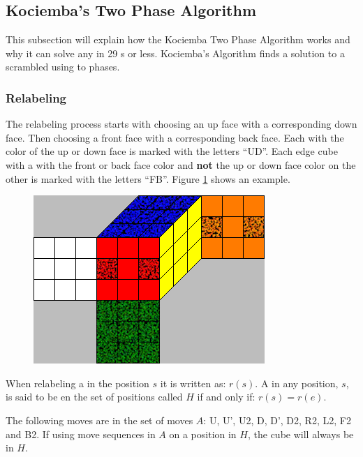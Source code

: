 \subsection{Kociemba's Two Phase Algorithm}
This subsection will explain how the Kociemba Two Phase Algorithm works and why it can solve any \rubik{} in 29 \twist{}s or less. Kociemba's Algorithm finds a solution to a scrambled \rubik{} using to phases.

\subsubsection{Relabeling}
The relabeling process  starts with choosing an up face with a corresponding down face. Then choosing a front face with a corresponding back face. Each \facelet{} with the color of the up or down face is marked with the letters ``UD''. Each edge cube with a \facelet{} with the front or back face color and \textbf{not} the up or down face color on the other \facelet{} is marked with the letters ``FB''. Figure \ref{fig:relabel1} shows an example.

\begin{figure}[hb]
	\centering
		\includegraphics{input/pics/relabel1}
	\caption{}
	\label{fig:relabel1}
\end{figure}

When relabeling a \rubik{} in the position $s$ it is written as: $r(s)$. A \rubik{} in any position, $s$, is said to be en the set of positions called $H$ if and only if: $r(s)=r(e)$.

The following moves are in the set of moves $A$: U, U', U2, D, D', D2, R2, L2, F2 and B2. If using move sequences in $A$ on a position in $H$, the cube will always be in $H$.
